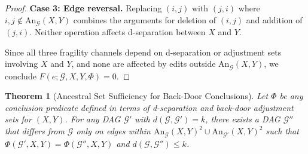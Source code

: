 \documentclass[11pt,a4paper]{article}
\newtheorem{theorem}{Theorem}[section]
\theoremstyle{definition}
\theoremstyle{remark}
\newcommand{\DAG}{\mathcal{G}}
\newcommand{\An}{\mathrm{An}}
\newcommand{\editdist}{d}
\newcommand{\fragility}{F}
\newcommand{\Phi}{\varPhi}
\begin{document}
\begin{proof}
\textbf{Case 3: Edge reversal.} Replacing $(i, j)$ with $(j, i)$ where $i, j \notin
\An_\DAG(X,Y)$ combines the arguments for deletion of $(i,j)$ and addition of $(j,i)$.
Neither operation affects d-separation between $X$ and $Y$.

Since all three fragility channels depend on d-separation or adjustment sets involving
$X$ and $Y$, and none are affected by edits outside $\An_\DAG(X,Y)$, we conclude
$\fragility(e; \DAG, X, Y, \Phi) = 0$.
\end{proof}

\begin{theorem}[Ancestral Set Sufficiency for Back-Door Conclusions]\label{thm:ancestral_suff}
Let $\Phi$ be any conclusion predicate defined in terms of d-separation and back-door
adjustment sets for $(X,Y)$. For any DAG $\DAG'$ with $\editdist(\DAG, \DAG') = k$,
there exists a DAG $\DAG''$ that differs from $\DAG$ only on edges within
$\An_\DAG(X,Y)^2 \cup \An_{\DAG'}(X,Y)^2$ such that
$\Phi(\DAG', X, Y) = \Phi(\DAG'', X, Y)$ and $\editdist(\DAG, \DAG'') \leq k$.
\end{theorem}
\end{document}
